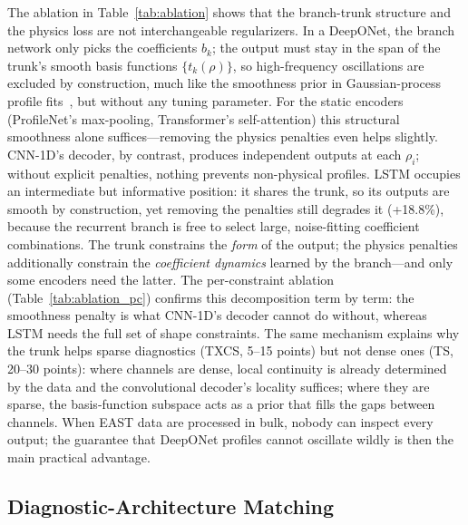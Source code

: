 \documentclass[a4paper,12pt]{article}
\begin{document}
The ablation in Table~\ref{tab:ablation} shows that the branch-trunk structure and the physics loss are not interchangeable regularizers. In a DeepONet, the branch network only picks the coefficients $b_k$; the output must stay in the span of the trunk's smooth basis functions $\{t_k(\rho)\}$, so high-frequency oscillations are excluded by construction, much like the smoothness prior in Gaussian-process profile fits~\cite{gpr_profiles,gpr_review}, but without any tuning parameter. For the static encoders (ProfileNet's max-pooling, Transformer's self-attention) this structural smoothness alone suffices---removing the physics penalties even helps slightly. CNN-1D's decoder, by contrast, produces independent outputs at each $\rho_i$; without explicit penalties, nothing prevents non-physical profiles. LSTM occupies an intermediate but informative position: it shares the trunk, so its outputs are smooth by construction, yet removing the penalties still degrades it (+18.8\%), because the recurrent branch is free to select large, noise-fitting coefficient combinations. The trunk constrains the \textit{form} of the output; the physics penalties additionally constrain the \textit{coefficient dynamics} learned by the branch---and only some encoders need the latter. The per-constraint ablation (Table~\ref{tab:ablation_pc}) confirms this decomposition term by term: the smoothness penalty is what CNN-1D's decoder cannot do without, whereas LSTM needs the full set of shape constraints. The same mechanism explains why the trunk helps sparse diagnostics (TXCS, 5--15 points) but not dense ones (TS, 20--30 points): where channels are dense, local continuity is already determined by the data and the convolutional decoder's locality suffices; where they are sparse, the basis-function subspace acts as a prior that fills the gaps between channels. When EAST data are processed in bulk, nobody can inspect every output; the guarantee that DeepONet profiles cannot oscillate wildly is then the main practical advantage.

\subsection{Diagnostic-Architecture Matching}
\end{document}

